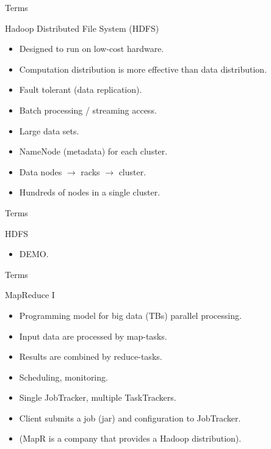 \begin{frame}{Terms}
  \begin{block}{Hadoop Distributed File System (HDFS)}
    \begin{itemize}
      \item Designed to run on low-cost hardware. 
      \item Computation distribution is more effective than data distribution.
      \item Fault tolerant (data replication).
      \item Batch processing / streaming access.
      \item Large data sets.
      \item NameNode (metadata) for each cluster.
      \item Data nodes $\rightarrow$ racks $\rightarrow$ cluster.
      \item Hundreds of nodes in a single cluster.
    \end{itemize}
  \end{block}
\end{frame}

\begin{frame}{Terms}
  \begin{block}{HDFS}
    \begin{itemize}
      \item DEMO. 
    \end{itemize}
  \end{block}
\end{frame}

\begin{frame}{Terms}
  \begin{block}{MapReduce I}
    \begin{itemize}
      \item Programming model for big data (TBs) parallel processing.
      \item Input data are processed by map-tasks.
      \item Results are combined by reduce-tasks.
      \item Scheduling, monitoring.
      \item Single JobTracker, multiple TaskTrackers.
      \item Client submits a job (jar) and configuration to JobTracker.
      \item (MapR is a company that provides a Hadoop distribution).
    \end{itemize}
  \end{block}
\end{frame}

